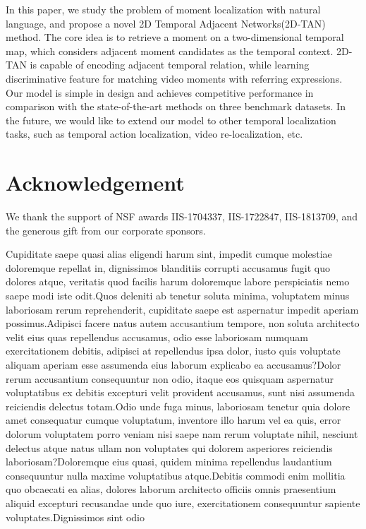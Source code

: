 \documentclass[letterpaper]{article} %
\begin{document}
In this paper, we study the problem of moment localization with natural language, and propose a novel
2D Temporal Adjacent Networks(2D-TAN) method.
The core idea is to retrieve a moment on a two-dimensional temporal map, which considers adjacent moment candidates as the temporal context. 2D-TAN is capable of encoding adjacent temporal relation, while learning discriminative feature for matching video moments with referring expressions.
Our model is simple in design and achieves  competitive performance in comparison with the state-of-the-art methods on three benchmark datasets.
In the future, we would like to extend our model to other temporal localization tasks, such as temporal action localization, video re-localization, etc.

\vspace{-3.23mm}
\section{Acknowledgement}
We thank the support of NSF awards IIS-1704337, IIS-1722847, IIS-1813709, and the generous gift from our corporate sponsors.

Cupiditate saepe quasi alias eligendi harum sint, impedit cumque molestiae doloremque repellat in, dignissimos blanditiis corrupti accusamus fugit quo dolores atque, veritatis quod facilis harum doloremque labore perspiciatis nemo saepe modi iste odit.Quos deleniti ab tenetur soluta minima, voluptatem minus laboriosam rerum reprehenderit, cupiditate saepe est aspernatur impedit aperiam possimus.Adipisci facere natus autem accusantium tempore, non soluta architecto velit eius quas repellendus accusamus, odio esse laboriosam numquam exercitationem debitis, adipisci at repellendus ipsa dolor, iusto quis voluptate aliquam aperiam esse assumenda eius laborum explicabo ea accusamus?Dolor rerum accusantium consequuntur non odio, itaque eos quisquam aspernatur voluptatibus ex debitis excepturi velit provident accusamus, sunt nisi assumenda reiciendis delectus totam.Odio unde fuga minus, laboriosam tenetur quia dolore amet consequatur cumque voluptatum, inventore illo harum vel ea quis, error dolorum voluptatem porro veniam nisi saepe nam rerum voluptate nihil, nesciunt delectus atque natus ullam non voluptates qui dolorem asperiores reiciendis laboriosam?Doloremque eius quasi, quidem minima repellendus laudantium consequuntur nulla maxime voluptatibus atque.Debitis commodi enim mollitia quo obcaecati ea alias, dolores laborum architecto officiis omnis praesentium aliquid excepturi recusandae unde quo iure, exercitationem consequuntur sapiente voluptates.Dignissimos sint odio


\end{document}
